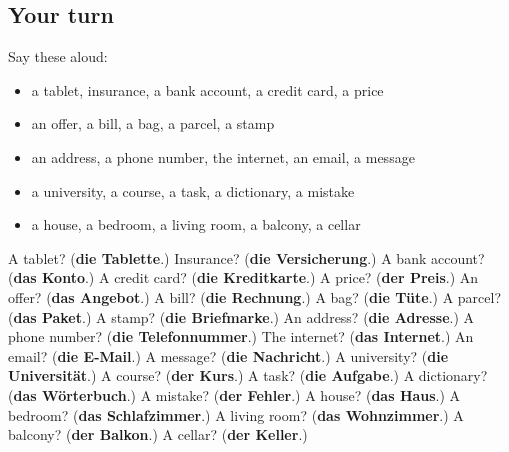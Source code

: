 \subsection*{Your turn}
Say these aloud:

\begin{itemize}
\raggedright
  \item a tablet, insurance, a bank account, a credit card, a price
  \item an offer, a bill, a bag, a parcel, a stamp
  \item an address, a phone number, the internet, an email, a message
  \item a university, a course, a task, a dictionary, a mistake
  \item a house, a bedroom, a living room, a balcony, a cellar
\end{itemize}

\begin{tcolorbox}[breakable,colback=teal!4,colframe=teal!35!black,title={Before you move on}]
A tablet? (\textbf{die Tablette}.) Insurance? (\textbf{die Versicherung}.) A bank account? (\textbf{das Konto}.) A credit card? (\textbf{die Kreditkarte}.) A price? (\textbf{der Preis}.) An offer? (\textbf{das Angebot}.) A bill? (\textbf{die Rechnung}.) A bag? (\textbf{die Tüte}.) A parcel? (\textbf{das Paket}.) A stamp? (\textbf{die Briefmarke}.) An address? (\textbf{die Adresse}.) A phone number? (\textbf{die Telefonnummer}.) The internet? (\textbf{das Internet}.) An email? (\textbf{die E-Mail}.) A message? (\textbf{die Nachricht}.) A university? (\textbf{die Universität}.) A course? (\textbf{der Kurs}.) A task? (\textbf{die Aufgabe}.) A dictionary? (\textbf{das Wörterbuch}.) A mistake? (\textbf{der Fehler}.) A house? (\textbf{das Haus}.) A bedroom? (\textbf{das Schlafzimmer}.) A living room? (\textbf{das Wohnzimmer}.) A balcony? (\textbf{der Balkon}.) A cellar? (\textbf{der Keller}.)
\end{tcolorbox}
